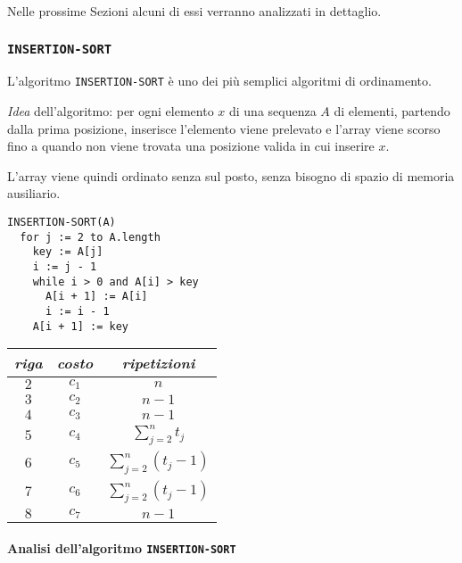 \documentclass[italian, 10pt]{article}
\begin{document}
\bigskip
Nelle prossime Sezioni alcuni di essi verranno analizzati in dettaglio.

\subsubsection{\texttt{INSERTION-SORT}}

L'algoritmo \texttt{INSERTION-SORT} è uno dei più semplici algoritmi di ordinamento.

\textit{Idea} dell'algoritmo:
per ogni elemento \(x\) di una sequenza \(A\) di elementi, partendo dalla prima posizione, inserisce l'elemento viene prelevato e l'array viene scorso fino a quando non viene trovata una posizione valida in cui inserire \(x\).

L'array viene quindi ordinato senza sul posto, senza bisogno di spazio di memoria ausiliario.

\begin{minipage}{0.45\textwidth}
  \begin{lstlisting}[style=pseudocode, label={Pseudocodice dell'algoritmo di Insertion Sort}, label={lst:pseudocodice-insertion-sort}]
INSERTION-SORT(A)
  for j := 2 to A.length
    key := A[j]
    i := j - 1
    while i > 0 and A[i] > key
      A[i + 1] := A[i]
      i := i - 1
    A[i + 1] := key
    \end{lstlisting}
\end{minipage}
\begin{minipage}{0.45\textwidth}
  \centering
  \begin{tabular}{ccc}
    \textit{riga} & \textit{costo} & \textit{ripetizioni}     \\ \hline
    \(2\)         & \(c_1\)        & \(n\)                    \\
    \(3\)         & \(c_2\)        & \(n-1\)                  \\
    \(4\)         & \(c_3\)        & \(n-1\)                  \\
    \(5\)         & \(c_4\)        & \(\sum_{j=2}^n t_j\)     \\
    \(6\)         & \(c_5\)        & \(\sum_{j=2}^n (t_j-1)\) \\
    \(7\)         & \(c_6\)        & \(\sum_{j=2}^n (t_j-1)\) \\
    \(8\)         & \(c_7\)        & \(n-1\)                  \\
  \end{tabular}
\end{minipage}

\paragraph{Analisi dell'algoritmo \texttt{INSERTION-SORT}}
\end{document}

